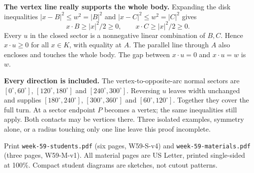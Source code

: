 \documentclass[11pt,letterpaper]{article}
\newcommand{\heading}[1]{\par\vspace{2pt}{\large\bfseries #1}\par}
\newcommand{\lead}[1]{\textbf{#1}}
\newcommand{\reuleaux}{\draw[line width=.6pt] (60,0) arc[start angle=0,end angle=60,radius=60] arc[start angle=120,end angle=180,radius=60] arc[start angle=240,end angle=300,radius=60] -- cycle;}
\begin{document}
\begin{center}
\end{center}
\lead{The vertex line really supports the whole body.} Expanding the disk inequalities $|x-B|^2\le w^2=|B|^2$ and $|x-C|^2\le w^2=|C|^2$ gives
\[
 x\cdot B\ge |x|^2/2\ge0,\qquad x\cdot C\ge |x|^2/2\ge0.
\]
Every $u$ in the closed sector is a nonnegative linear combination of $B,C$. Hence $x\cdot u\ge0$ for all $x\in K$, with equality at $A$. The parallel line through $A$ also encloses and touches the whole body. The gap between $x\cdot u=0$ and $x\cdot u=w$ is $w$.

\lead{Every direction is included.} The vertex-to-opposite-arc normal sectors are $[0^\circ,60^\circ]$, $[120^\circ,180^\circ]$ and $[240^\circ,300^\circ]$. Reversing $u$ leaves width unchanged and supplies $[180^\circ,240^\circ]$, $[300^\circ,360^\circ]$ and $[60^\circ,120^\circ]$. Together they cover the full turn. At a sector endpoint $P$ becomes a vertex; the same inequalities still apply. Both contacts may be vertices there. Three isolated examples, symmetry alone, or a radius touching only one line leave this proof incomplete.

\newpage
\heading{Preparation: a reusable kit, not weekly cutting}
Print \texttt{week-59-students.pdf} (six pages, W59-S-v4) and \texttt{week-59-materials.pdf} (three pages, W59-M-v1). All material pages are US Letter, printed single-sided at 100\%. Compact student diagrams are sketches, not cutout patterns.
\end{document}
